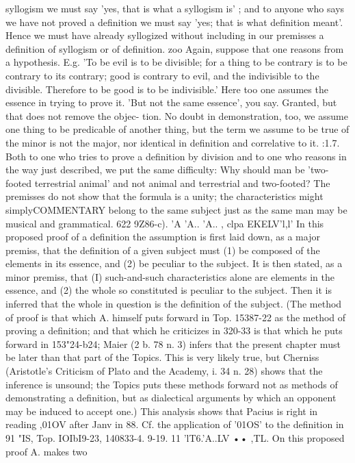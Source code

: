 {{{{{{{{{{{{{{{{{{{{syllogism we must say 'yes, that is what a syllogism is' ; and to
anyone who says we have not proved a definition we must say
'yes; that is what definition meant'. Hence we must have
already syllogized without including in our premisses a definition
of syllogism or of definition.
zoo Again, suppose that one reasons from a hypothesis. E.g.
'To be evil is to be divisible; for a thing to be contrary is to be
contrary to its contrary; good is contrary to evil, and the indivisible
to the divisible. Therefore to be good is to be indivisible.' Here too
one assumes the essence in trying to prove it. 'But not the same
essence', you say. Granted, but that does not remove the objec-
tion. No doubt in demonstration, too, we assume one thing to
be predicable of another thing, but the term we assume to be true
of the minor is not the major, nor identical in definition and
correlative to it.
:1.7. Both to one who tries to prove a definition by division and
to one who reasons in the way just described, we put the same
difficulty: Why should man be 'two-footed terrestrial animal' and
not animal and terrestrial and two-footed? The premisses do not
show that the formula is a unity; the characteristics might simplyCOMMENTARY
belong to the same subject just as the same man may be musical
and grammatical.
622
9Z86-c). 'A 'A.. 'A.. , clpa
EKELV'l,l'
In this proposed proof of a
definition the assumption is first laid down, as a major premiss,
that the definition of a given subject must (1) be composed of
the elements in its essence, and (2) be peculiar to the subject.
It is then stated, as a minor premiss, that (I) such-and-such
characteristics alone are elements in the essence, and (2) the whole
so constituted is peculiar to the subject. Then it is inferred that
the whole in question is the definition of the subject. (The method
of proof is that which A. himself puts forward in Top. 15387-22
as the method of proving a definition; and that which he criticizes
in 320-33 is that which he puts forward in 153"24-b24; Maier
(2 b. 78 n. 3) infers that the present chapter must be later than
that part of the Topics. This is very likely true, but Cherniss
(Aristotle's Criticism of Plato and the Academy, i. 34 n. 28) shows
that the inference is unsound; the Topics puts these methods
forward not as methods of demonstrating a definition, but as
dialectical arguments by which an opponent may be induced
to accept one.)
This analysis shows that Pacius is right in reading ,01OV after
Janv in 88. Cf. the application of '01OS' to the definition in 91 "IS,
Top. IOIbI9-23, 140833-4.
9-19. 11 'lT6.'A..LV •• ,TL. On this proposed proof A. makes two
}}}}}}}}}}}}}}}}}}}}
